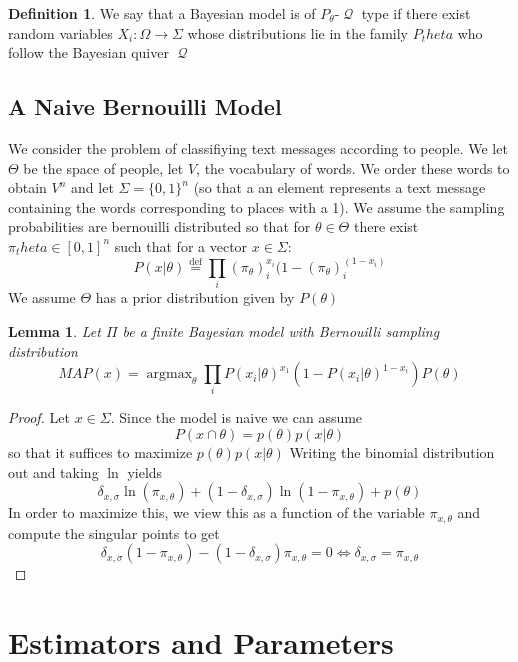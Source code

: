 \documentclass{book}
\theoremstyle{plain}
\newtheorem{lemma}[corollary]{Lemma}
\theoremstyle{definition}
\newtheorem{definition}[corollary]{Definition}
\DeclareMathOperator{\argmax}{argmax}
\newcommand{\define}{\stackrel{\operatorname{def}}{=}}
\newcommand{\mor}{\longrightarrow}
\DeclareMathOperator{\Qvr}{\mathcal{Q}}
\begin{document}
\begin{definition}
We say that a Bayesian model is of $P_\theta$-$\Qvr$ type if there exist random variables $X_i:\Omega	\mor \Sigma$ whose distributions lie in the family $P_theta$ who follow the Bayesian quiver $\Qvr$
\end{definition}



\subsection{A Naive Bernouilli Model}

We consider the problem of classifiying text messages according to people. We let $\Theta$ be the space of people, let $V$, the vocabulary of words. We order these words to obtain $V^n$ and  let $\Sigma=\{0,1\}^n$ (so that a an element represents a text message containing the words corresponding to places with a 1). We assume the sampling probabilities are bernouilli distributed so that for $\theta \in \Theta$ there exist $\pi_theta \in [0,1]^n$ such that for a vector $x \in \Sigma$:
\[
P(x\vert \theta)\define \prod_i (\pi_\theta)_i^{x_i} (1-(\pi_\theta)_i^{(1-x_i)}
\]
We assume $\Theta$ has a prior distribution given by $P(\theta)$

\begin{lemma}
Let $\Pi$ be a finite Bayesian model with Bernouilli sampling distribution
\[
MAP(x)=\argmax_\theta \prod_i P(x_i\vert \theta)^{x_1}(1-P(x_i\vert \theta)^{1-x_i})P(\theta)
\]
\end{lemma}


\begin{proof}
Let $x \in \Sigma$. Since the model is naive we can assume
\[
P(x\cap \theta)=p(\theta)p(x\vert \theta)
\]	
so that it suffices to maximize $p(\theta)p(x\vert \theta)$
Writing the binomial distribution out and taking $\ln$ yields
\[
\delta_{x,\sigma}\ln(\pi_{x,\theta})+(1-\delta_{x,\sigma})\ln(1-\pi_{x,\theta})+p(\theta)
\]
In order to maximize this, we view this as a function of the variable $\pi_{x,\theta}$ and compute the singular points to get
\[
\delta_{x,\sigma}(1-\pi_{x,\theta})-(1-\delta_{x,\sigma})\pi_{x,\theta}=0\iff \delta_{x,\sigma}=\pi_{x,\theta}
\]

\end{proof}



\section{Estimators and Parameters}
\end{document}
